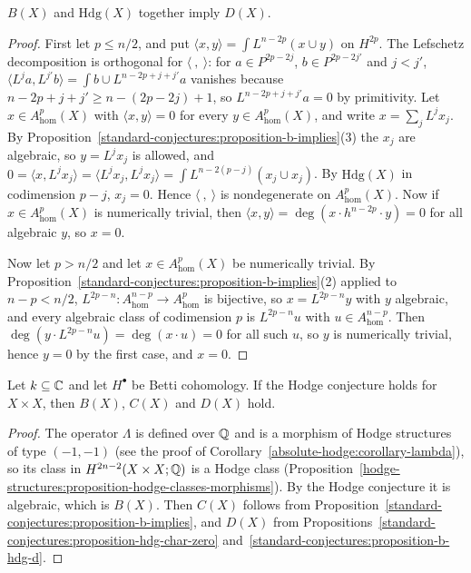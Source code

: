 \begin{proposition}\label{standard-conjectures:proposition-b-hdg-d}
$B(X)$ and $\mathrm{Hdg}(X)$ together imply $D(X)$.
\end{proposition}

\begin{proof}
First let $p \leq n/2$, and put $\langle x, y\rangle = \int L^{n-2p}(x \cup y)$ on $H^{2p}$. The Lefschetz decomposition is orthogonal for $\langle\ ,\ \rangle$: for $a \in P^{2p-2j}$, $b \in P^{2p-2j'}$ and $j < j'$,
$\langle L^ja, L^{j'}b\rangle = \int b \cup L^{n-2p+j+j'}a$ vanishes because $n - 2p + j + j' \geq n - (2p - 2j) + 1$, so $L^{n-2p+j+j'}a = 0$ by primitivity. Let $x \in A^p_{\mathrm{hom}}(X)$ with $\langle x, y\rangle = 0$ for every
$y \in A^p_{\mathrm{hom}}(X)$, and write $x = \sum_jL^jx_j$. By Proposition~\ref{standard-conjectures:proposition-b-implies}(3) the $x_j$ are algebraic, so $y = L^jx_j$ is allowed, and
$0 = \langle x, L^jx_j\rangle = \langle L^jx_j, L^jx_j\rangle = \int L^{n-2(p-j)}(x_j \cup x_j)$. By $\mathrm{Hdg}(X)$ in codimension $p - j$, $x_j = 0$. Hence $\langle\ ,\ \rangle$ is nondegenerate on $A^p_{\mathrm{hom}}(X)$.
Now if $x \in A^p_{\mathrm{hom}}(X)$ is numerically trivial, then $\langle x, y\rangle = \deg(x \cdot h^{n-2p} \cdot y) = 0$ for all algebraic $y$, so $x = 0$.

Now let $p > n/2$ and let $x \in A^p_{\mathrm{hom}}(X)$ be numerically trivial. By Proposition~\ref{standard-conjectures:proposition-b-implies}(2) applied to $n - p < n/2$, $L^{2p-n} \colon A^{n-p}_{\mathrm{hom}} \to A^p_{\mathrm{hom}}$ is
bijective, so $x = L^{2p-n}y$ with $y$ algebraic, and every algebraic class of codimension $p$ is $L^{2p-n}u$ with $u \in A^{n-p}_{\mathrm{hom}}$. Then $\deg(y \cdot L^{2p-n}u) = \deg(x \cdot u) = 0$ for all such $u$, so $y$ is
numerically trivial, hence $y = 0$ by the first case, and $x = 0$.
\end{proof}

\begin{theorem}\label{standard-conjectures:theorem-hodge-implies-standard}
Let $k \subseteq \mathbb{C}$ and let $H^\bullet$ be Betti cohomology. If the Hodge conjecture holds for $X \times X$, then $B(X)$, $C(X)$ and $D(X)$ hold.
\end{theorem}

\begin{proof}
The operator $\Lambda$ is defined over $\mathbb{Q}$ and is a morphism of Hodge structures of type $(-1,-1)$ (see the proof of Corollary~\ref{absolute-hodge:corollary-lambda}), so its class in
$H^{2n-2}(X \times X; \mathbb{Q})$ is a Hodge class (Proposition~\ref{hodge-structures:proposition-hodge-classes-morphisms}). By the Hodge conjecture it is algebraic, which is $B(X)$. Then $C(X)$ follows from
Proposition~\ref{standard-conjectures:proposition-b-implies}, and $D(X)$ from Propositions~\ref{standard-conjectures:proposition-hdg-char-zero} and~\ref{standard-conjectures:proposition-b-hdg-d}.
\end{proof}

